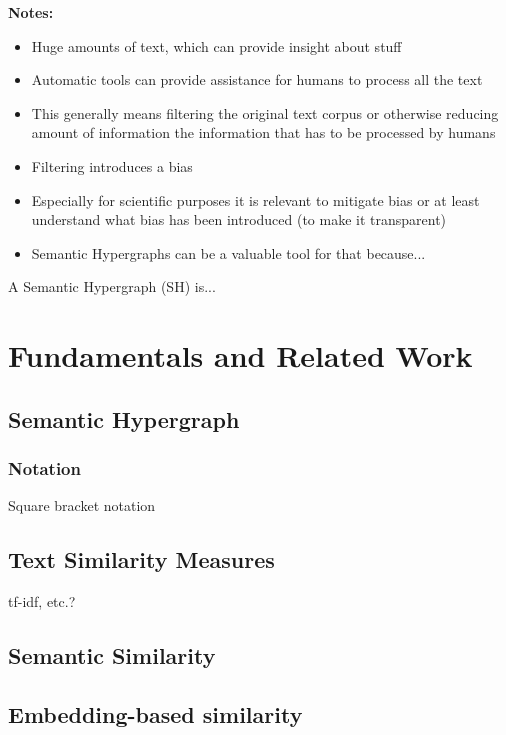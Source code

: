 \documentclass[11pt]{scrreprt}
\newcommand{\citep}{\parencite}  %
\begin{document}
\textbf{Notes:}
\begin{itemize}
	\item Huge amounts of text, which can provide insight about stuff
	\item Automatic tools can provide assistance for humans to process all the text
	\item This generally means filtering the original text corpus or otherwise reducing amount of information the information that has to be processed by humans
	\item Filtering introduces a bias
	\item Especially for scientific purposes it is relevant to mitigate bias or at least understand what bias has been introduced (to make it transparent)
	\item Semantic Hypergraphs can be a valuable tool for that because...
\end{itemize}

A Semantic Hypergraph (SH) \citep{menezes_semantic_2021} is...



\chapter{Fundamentals and Related Work}
\section{Semantic Hypergraph}

\subsection{Notation}

Square bracket notation 


\section{Text Similarity Measures}

tf-idf, etc.?


\section{Semantic Similarity}


\section{Embedding-based similarity}
\end{document}
